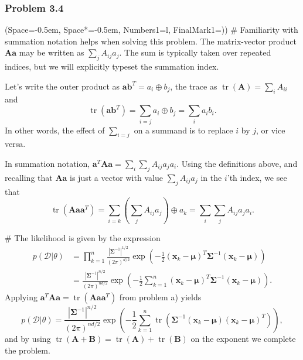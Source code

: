 \documentclass[12pt, a4paper]{article}
\newcommand{\listSpace}{-0.5em}%
\newcommand{\D}{\mathcal{D}}
\newcommand{\vect}[1]{\bm{#1}}
\newcommand{\abs}[1]{\left\lvert#1\right\rvert}
\begin{document}
\subsubsection*{Problem 3.4}
\begin{easylist}[enumerate]
\ListProperties(Space=\listSpace, Space*=\listSpace, Numbers1=l, FinalMark1={)})
# Familiarity with summation notation helps when solving this problem.
The matrix-vector product $\vect{A}\vect{a}$ may be written as $\sum_j A_{ij} a_j$.
The sum is typically taken over repeated indices, but we will explicitly typeset the summation index.

Let's write the outer product as $\vect{a}\vect{b}^T = a_i \oplus b_j$, the trace as $\operatorname{tr}(\vect{A}) = \sum_i A_{ii}$ and
\begin{equation*}
	\operatorname{tr}(\vect{a}\vect{b}^T) = \sum_{i = j} a_i \oplus b_j = \sum_{i} a_i b_i.
\end{equation*}
In other words, the effect of $\sum_{i = j}$ on a summand is to replace $i$ by $j$, or vice versa.

In summation notation, $\vect{a}^T \vect{A} \vect{a} = \sum_i \sum_j A_{ij} a_j a_i$.
Using the definitions above, and recalling that $\vect{A} \vect{a}$ is just a vector with value $\sum_j A_{ij} a_j$ in the $i$'th index, we see that
\begin{equation*}
	\operatorname{tr}( \vect{A} \vect{a} \vect{a}^T) = \sum_{i=k}  \left( \sum_j A_{ij} a_j \right) \oplus a_k = \sum_i \sum_j A_{ij} a_j a_i.
\end{equation*}

# The likelihood is given by the expression
\begin{align*}
	p(\D | \theta) &= \prod_{k=1}^{n} \frac{\abs{\vect{\Sigma}^{-1}}^{1/2}}{\left(2 \pi \right)^{d/2}} \exp \left( -\frac{1}{2} \left( \vect{x}_k - \vect{\mu} \right)^T  \vect{\Sigma}^{-1}  \left( \vect{x}_k - \vect{\mu} \right)\right) \\
	&=  \frac{\abs{\vect{\Sigma}^{-1}}^{n/2}}{\left(2 \pi \right)^{nd/2}} \exp \left( -\frac{1}{2}  \sum_{k=1}^{n} \left( \vect{x}_k - \vect{\mu} \right)^T  \vect{\Sigma}^{-1}  \left( \vect{x}_k - \vect{\mu} \right)\right).
\end{align*}
Applying $ \vect{a}^T \vect{A} \vect{a} = \operatorname{tr}( \vect{A} \vect{a} \vect{a}^T)$ from problem a) yields
\begin{equation*}
p(\D | \theta) = \frac{\abs{\vect{\Sigma}^{-1}}^{n/2}}{\left(2 \pi \right)^{nd/2}} \exp \left( -\frac{1}{2}  \sum_{k=1}^{n} 
\operatorname{tr} \left( \vect{\Sigma}^{-1} \left( \vect{x}_k - \vect{\mu} \right) \left( \vect{x}_k - \vect{\mu} \right)^T \right)
\right),
\end{equation*}
and by using $\operatorname{tr}\left(\vect{A} + \vect{B}\right) = \operatorname{tr}\left(\vect{A}\right) + \operatorname{tr}\left( \vect{B}\right)$ on the exponent we complete the problem.


\end{easylist}
\end{document}

